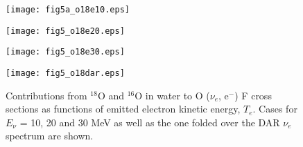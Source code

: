 \documentclass[preprint,12pt]{elsarticle}
\begin{document}
\begin{figure}[htbp]
\vspace*{-2cm}
\hspace*{-2.0cm}
\begin{minipage}{0.45\hsize}
\begin{center}
\texttt{[image: fig5a\_o18e10.eps]}
\end{center}
\end{minipage}
\hspace{-15mm}
\begin{minipage}{0.45\hsize}
\begin{center}
\hspace*{-0.7cm}
\texttt{[image: fig5\_o18e20.eps]}
\end{center}
\end{minipage}
\hspace{-15mm}
\vspace*{-1.0cm}
\begin{minipage}{0.45\hsize}
\begin{center}
\vspace*{-1.0cm}
\hspace*{-0.7cm}
\texttt{[image: fig5\_o18e30.eps]}
\end{center}
\end{minipage}
\begin{minipage}{0.45\hsize}
\begin{center}
\vspace*{-1.0cm}
\hspace*{-1.2cm}
\texttt{[image: fig5\_o18dar.eps]}
\end{center}
\end{minipage}
\vspace{-1cm}
\caption{\small 
Contributions from $^{18}$O and $^{16}$O in water to O ($\nu_e$, e$^{-}$) F cross sections as functions of emitted electron kinetic energy, $T_e$.
Cases for $E_{\nu}$ = 10, 20 and 30 MeV as well as the one folded over the DAR $\nu_e$ spectrum are shown.
}
\label{1816OEn}
\end{figure}
\end{document}
